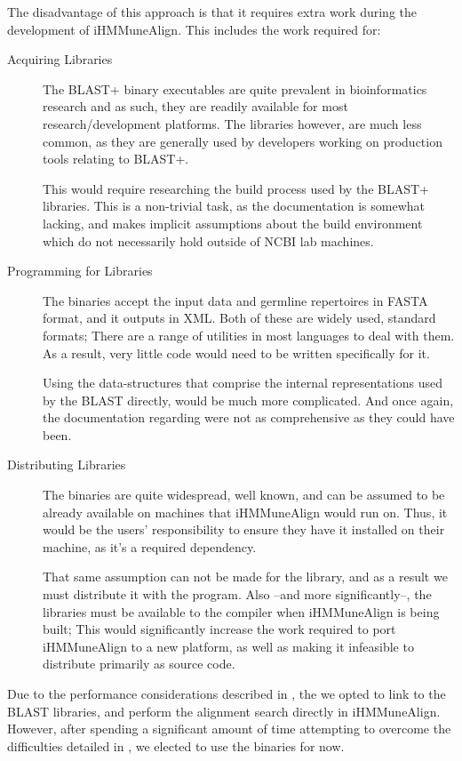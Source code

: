 The disadvantage of this approach is that it requires extra work during the development of iHMMuneAlign. This includes the work required for:
\begin{description}
	\item[Acquiring Libraries]
	The BLAST+ binary executables are quite prevalent in bioinformatics research and as such, they are readily available for most research/development platforms. The libraries however, are much less common, as they are generally used by developers working on production tools relating to BLAST+. 
	
	This would require researching the build process used by the BLAST+ libraries. This is a non-trivial task, as the documentation is somewhat lacking, and makes implicit assumptions about the build environment which do not necessarily hold outside of NCBI lab machines.
	\item[Programming for Libraries]
	\label{subsec:blast-lib-xml}
	The binaries accept the input data and germline repertoires in FASTA format, and it outputs in XML. Both of these are widely used, standard formats; There are a range of utilities in most languages to deal with them. As a result, very little code would need to be written specifically for it.
	
	Using the data-structures that comprise the internal representations used by the BLAST directly, would be much more complicated. And once again, the documentation regarding were not as comprehensive as they could have been.
	\item[Distributing Libraries]
	The binaries are quite widespread, well known, and can be assumed to be already available on machines that iHMMuneAlign would run on. Thus, it would be the users' responsibility to ensure they have it installed on their machine, as it's a required dependency.
	
	That same assumption can not be made for the library, and as a result we must distribute it with the program. Also --and more significantly--, the libraries must be available to the compiler when iHMMuneAlign is being built; This would significantly increase the work required to port iHMMuneAlign to a new platform, as well as making it infeasible to distribute primarily as source code.
\end{description}

Due to the performance considerations described in , the we opted to link to the BLAST libraries, and perform the alignment search directly in iHMMuneAlign. However, after spending a significant amount of time attempting to overcome the difficulties detailed in , we elected to use the binaries for now. 

